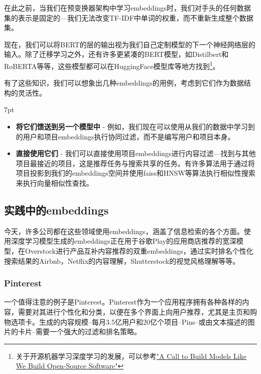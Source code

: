 \documentclass[Chinese, 11pt, table]{diazessay} %
\newenvironment{formal}{%
  \def\FrameCommand{%
	\hspace{1pt}%
	{\color{w_lightblue}\vrule width 2pt}%
	{\color{formalshade}\vrule width 4pt}%
	\colorbox{formalshade}%
  }%
  \MakeFramed{\advance\hsize-\width\FrameRestore}%
  \noindent\hspace{-4.55pt}%
  \begin{adjustwidth}{}{7pt}%
  \vspace{2pt}\vspace{2pt}%
}
{%
  \vspace{2pt}\end{adjustwidth}\endMakeFramed%
}
\begin{document}
\begin{CJK}{UTF8}{gbsn}
\begin{sloppypar}
\begin{itemize}
在此之前，当我们在预变换器架构中学习embeddings时，我们对手头的任何数据集的表示是固定的---我们无法改变TF-IDF中单词的权重，而不重新生成整个数据集。
\end{itemize}

现在，我们可以将BERT的层的输出视为我们自己定制模型的下一个神经网络层的输入。除了迁移学习之外，还有许多更紧凑的BERT模型，如Distilbert和RoBERTA等等，这些模型都可以在HuggingFace模型库等地方找到\footnote{关于开源机器学习深度学习的发展，可以参考\href{https://colinraffel.com/blog/a-call-to-build-models-like-we-build-open-source-software.html}{"A Call to Build Models Like We Build Open-Source Software"}}。

有了这些知识，我们可以想象出几种embeddings的用例，考虑到它们作为数据结构的灵活性。

\begin{formal}
\begin{itemize}
\item\textbf{将它们馈送到另一个模型中} - 例如，我们现在可以使用从我们的数据中学习到的用户和项目embeddings执行协同过滤，而不是编写用户和项目本身。
\item\textbf{直接使用它们} - 我们可以直接使用项目embeddings进行内容过滤---找到与其他项目最接近的项目，这是推荐任务与搜索共享的任务。有许多算法用于通过将项目投影到我们的embeddings空间并使用faiss和HNSW等算法执行相似性搜索来执行向量相似性查找。
\end{itemize}
\end{formal}

\subsection{实践中的embeddings}

今天，许多公司都在这些领域使用embeddings，涵盖了信息检索的各个方面。使用深度学习模型生成的embeddings正在用于谷歌Play的应用商店推荐的宽深模型\citep{zhang2019deep}，在Overstock进行产品互补内容推荐的双重embeddings\citep{kvernadze2022two}，通过实时排名个性化搜索结果的Airbnb\citep{grbovic2018real}，Netflix的内容理解\citep{dye_ekandham_saluja_rastogi_2020}，Shutterstock的视觉风格理解\citep{gomez2022learning}等等。

\subsubsection{Pinterest}

一个值得注意的例子是Pinterest。Pinterest作为一个应用程序拥有各种各样的内容，需要对其进行个性化和分类，以便在多个界面上向用户推荐，尤其是主页和购物选项卡。生成的内容规模--每月3.5亿用户和20亿个项目--Pins--或由文本描述的图片的卡片--需要一个强大的过滤和排名策略。


\end{sloppypar}
\end{CJK}
\end{document}
